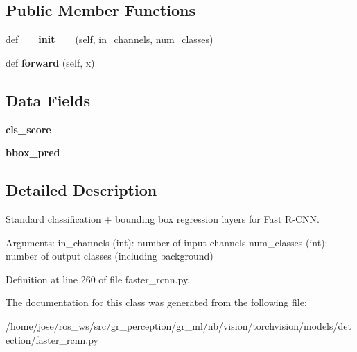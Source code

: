 \subsection*{Public Member Functions}
\begin{DoxyCompactItemize}
\item 
\mbox{\label{classtorchvision_1_1models_1_1detection_1_1faster__rcnn_1_1FastRCNNPredictor_aad5bd97748a3f72f9adecd570779eb81}} 
def {\bfseries \+\_\+\+\_\+init\+\_\+\+\_\+} (self, in\+\_\+channels, num\+\_\+classes)
\item 
\mbox{\label{classtorchvision_1_1models_1_1detection_1_1faster__rcnn_1_1FastRCNNPredictor_ae2d5f51285ebd55210c64664e8d318ad}} 
def {\bfseries forward} (self, x)
\end{DoxyCompactItemize}
\subsection*{Data Fields}
\begin{DoxyCompactItemize}
\item 
\mbox{\label{classtorchvision_1_1models_1_1detection_1_1faster__rcnn_1_1FastRCNNPredictor_adaec0f134914b768916dafdc5c7b0fe5}} 
{\bfseries cls\+\_\+score}
\item 
\mbox{\label{classtorchvision_1_1models_1_1detection_1_1faster__rcnn_1_1FastRCNNPredictor_af08d89d278aab686b23a315d36305ee5}} 
{\bfseries bbox\+\_\+pred}
\end{DoxyCompactItemize}


\subsection{Detailed Description}
\begin{DoxyVerb}Standard classification + bounding box regression layers
for Fast R-CNN.

Arguments:
    in_channels (int): number of input channels
    num_classes (int): number of output classes (including background)
\end{DoxyVerb}
 

Definition at line 260 of file faster\+\_\+rcnn.\+py.



The documentation for this class was generated from the following file\+:\begin{DoxyCompactItemize}
\item 
/home/jose/ros\+\_\+ws/src/gr\+\_\+perception/gr\+\_\+ml/nb/vision/torchvision/models/detection/faster\+\_\+rcnn.\+py\end{DoxyCompactItemize}
